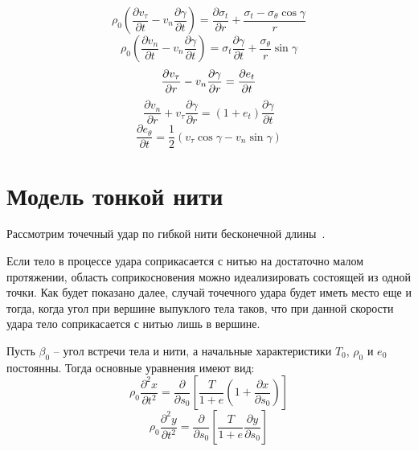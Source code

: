 \begin{equation}
    \rho_0 \left( \dfrac{\partial v_{\tau}}{\partial t} - v_n \dfrac{\partial \gamma}{\partial t} \right) = \dfrac{\partial \sigma_t}{\partial r} + \dfrac{\sigma_t - \sigma_{\theta} \cos{\gamma}}{r}
\end{equation}
\begin{equation}
    \rho_0 \left( \dfrac{\partial v_n}{\partial t} - v_n \dfrac{\partial \gamma}{\partial t} \right) = \sigma_t \dfrac{\partial \gamma}{\partial t} + \dfrac{\sigma_{\theta}}{r} \sin{\gamma}
\end{equation}
\begin{equation}
    \dfrac{\partial v_{\tau}}{\partial r} - v_n \dfrac{\partial \gamma}{\partial r} = \dfrac{\partial e_t}{\partial t} \\
\end{equation}
\begin{equation}
    \dfrac{\partial v_n}{\partial r} + v_{\tau} \dfrac{\partial \gamma}{\partial r} = \left( 1 + e_t \right) \dfrac{\partial \gamma}{\partial t}
\end{equation}
\begin{equation}
    \dfrac{\partial e_{\theta}}{\partial t} = \dfrac{1}{2} \left( v_{\tau} \cos{\gamma} - v_n \sin{\gamma} \right)
\end{equation}


\section{Модель тонкой нити}\label{sec:eq-fibers}
Рассмотрим точечный удар по гибкой нити бесконечной длины~\cite{rakhmatulin}.

Если тело в процессе удара соприкасается с нитью на достаточно малом протяжении, область соприкосновения можно
идеализировать состоящей из одной точки.
Как будет показано далее, случай точечного удара будет иметь место еще и тогда, когда угол при вершине выпуклого
тела таков, что при данной скорости удара тело соприкасается с нитью лишь в вершине.

Пусть $\beta_0$ -- угол встречи тела и нити, а начальные характеристики $T_0$, $\rho_0$ и $e_0$ постоянны.
Тогда основные уравнения имеют вид:
\begin{equation}
    \rho_0 \dfrac{\partial^2 x}{\partial t^2} = \dfrac{\partial}{\partial s_0} \left[ \dfrac{T}{1 + e} \left( 1 + \dfrac{\partial x}{\partial s_0} \right) \right]
\end{equation}
\begin{equation}
    \rho_0 \dfrac{\partial^2 y}{\partial t^2} = \dfrac{\partial}{\partial s_0} \left[ \dfrac{T}{1 + e} \dfrac{\partial y}{\partial s_0} \right]
\end{equation}
